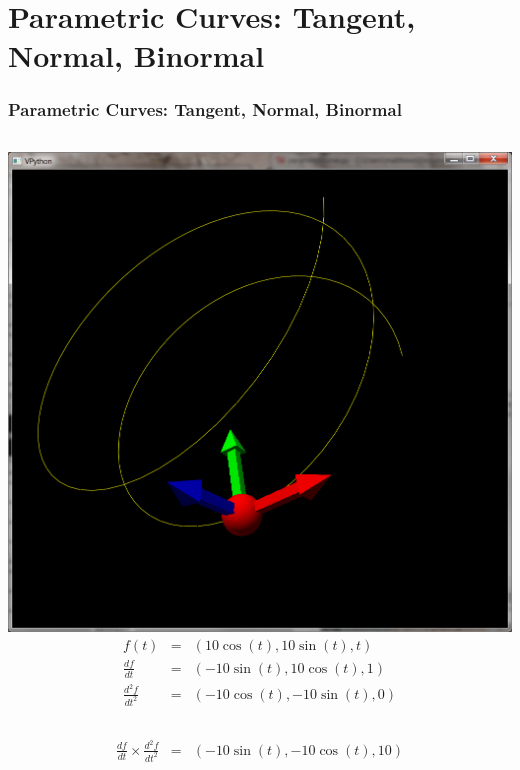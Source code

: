 \documentclass[slidestop,xcolor=pst]{beamer}
\newcommand{\sect}[1]{
\section{#1}
\begin{frame}[fragile]\frametitle{#1}
}
\begin{document}
\sect{Parametric Curves: Tangent, Normal, Binormal}
\begin{columns}[c]
\includegraphics[width=\textwidth]{images/vpythoncurveframe.png}
\begin{eqnarray*}
f(t) &=& (10\cos(t), 10\sin(t), t)\\
\frac{df}{dt} &=& (-10\sin(t), 10\cos(t), 1)\\
\frac{d^2f}{dt^2} &=& (-10\cos(t), -10\sin(t), 0)
\end{eqnarray*}
\end{columns}
\begin{eqnarray*}
\frac{df}{dt}\times \frac{d^2f}{dt^2} &=& (-10\sin(t), -10\cos(t), 10)
\end{eqnarray*}
\end{frame}
\end{document}
